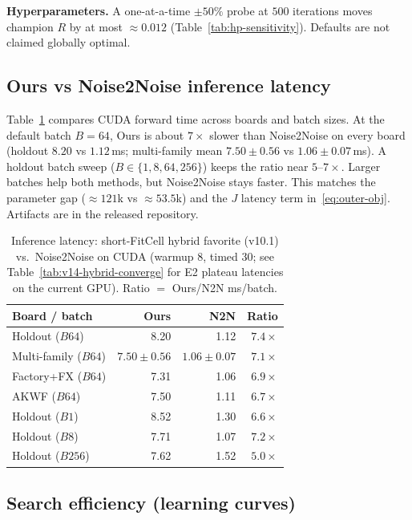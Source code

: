 \textbf{Hyperparameters.}
A one-at-a-time $\pm 50\%$ probe at $500$ iterations moves champion $R$ by at most ${\approx}0.012$
(Table~\ref{tab:hp-sensitivity}).
Defaults are not claimed globally optimal.

\subsection{Ours vs Noise2Noise inference latency}
\label{sec:ours-n2n-latency}

Table~\ref{tab:ours-n2n-latency} compares CUDA forward time across boards and batch sizes.
At the default batch $B{=}64$, Ours is about $7\times$ slower than Noise2Noise on every board
(holdout $8.20$ vs $1.12$\,ms; multi-family mean $7.50{\pm}0.56$ vs $1.06{\pm}0.07$\,ms).
A holdout batch sweep ($B\in\{1,8,64,256\}$) keeps the ratio near $5$--$7\times$.
Larger batches help both methods, but Noise2Noise stays faster.
This matches the parameter gap (${\approx}121$k vs ${\approx}53.5$k) and the $J$ latency term in~\eqref{eq:outer-obj}.
Artifacts are in the released repository.

\begin{table}[t]
  \centering
  \caption{Inference latency: short-FitCell hybrid favorite (v10.1) vs.\ Noise2Noise on CUDA (warmup 8, timed 30; see Table~\ref{tab:v14-hybrid-converge} for E2 plateau latencies on the current GPU).
    Ratio $=$ Ours/N2N ms/batch.}
  \label{tab:ours-n2n-latency}
  \setlength{\tabcolsep}{3pt}
  \scriptsize
  \begin{tabular}{@{}lrrr@{}}
    \toprule
    Board / batch & Ours & N2N & Ratio \\
    \midrule
    Holdout ($B64$) & 8.20 & 1.12 & $7.4\times$ \\
    Multi-family ($B64$) & $7.50{\pm}0.56$ & $1.06{\pm}0.07$ & $7.1\times$ \\
    Factory+FX ($B64$) & 7.31 & 1.06 & $6.9\times$ \\
    AKWF ($B64$) & 7.50 & 1.11 & $6.7\times$ \\
    Holdout ($B1$) & 8.52 & 1.30 & $6.6\times$ \\
    Holdout ($B8$) & 7.71 & 1.07 & $7.2\times$ \\
    Holdout ($B256$) & 7.62 & 1.52 & $5.0\times$ \\
    \bottomrule
  \end{tabular}
\end{table}

\subsection{Search efficiency (learning curves)}
\label{sec:search-learning-curve}

